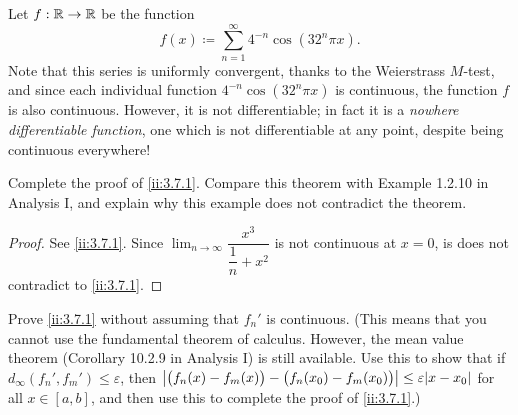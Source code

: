 \begin{eg}\label{ii:3.7.4}
  Let \(f : \mathbb{R} \to \mathbb{R}\) be the function
  \[
    f(x) \coloneqq \sum_{n = 1}^\infty 4^{-n} \cos(32^n \pi x).
  \]
  Note that this series is uniformly convergent, thanks to the Weierstrass \(M\)-test, and since each individual function \(4^{-n} \cos(32^n \pi x)\) is continuous, the function \(f\) is also continuous.
  However, it is not differentiable;
  in fact it is a \emph{nowhere differentiable function}, one which is not differentiable at any point, despite being continuous everywhere!
\end{eg}

\exercisesection

\begin{ex}\label{ii:ex:3.7.1}
  Complete the proof of \cref{ii:3.7.1}.
  Compare this theorem with Example 1.2.10 in Analysis I, and explain why this example does not contradict the theorem.
\end{ex}

\begin{proof}
  See \cref{ii:3.7.1}.
  Since \(\lim_{n \to \infty} \dfrac{x^3}{\dfrac{1}{n} + x^2}\) is not continuous at \(x = 0\), is does not contradict to \cref{ii:3.7.1}.
\end{proof}

\begin{ex}\label{ii:ex:3.7.2}
  Prove \cref{ii:3.7.1} without assuming that \(f_n'\) is continuous.
  (This means that you cannot use the fundamental theorem of calculus.
  However, the mean value theorem (Corollary 10.2.9 in Analysis I) is still available.
  Use this to show that if \(d_\infty(f_n', f_m') \leq \varepsilon\), then \(\abs{\big(f_n(x) - f_m(x)\big) - \big(f_n(x_0) - f_m(x_0)\big)} \leq \varepsilon \abs{x - x_0}\) for all \(x \in [a, b]\), and then use this to complete the proof of \cref{ii:3.7.1}.)
\end{ex}

